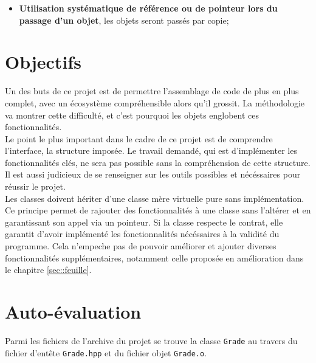 \documentclass[9pts]{article}
\begin{document}
\begin{itemize}
\item \textbf{Utilisation systématique de référence ou de pointeur lors du passage d'un objet}, les objets seront passés par copie;
\end{itemize}

\pagebreak

\section{Objectifs}

Un des buts de ce projet est de permettre l'assemblage de code de plus en plus complet, avec un écosystème compréhensible alors qu'il grossit. La méthodologie va montrer cette difficulté, et
c'est pourquoi les objets englobent ces fonctionnalités. \\

Le point le plus important dans le cadre de ce projet est de comprendre l'interface, la structure imposée. Le travail demandé, qui est d'implémenter les fonctionnalités clés, ne sera pas possible sans la compréhension de cette structure. Il est aussi judicieux de se renseigner sur les outils possibles et nécéssaires pour réussir le projet.\\

Les classes doivent hériter d'une classe mère virtuelle pure sans implémentation. Ce principe permet de rajouter des fonctionnalités à une classe sans l'altérer et en garantissant son appel via un pointeur.
Si la classe respecte le contrat, elle garantit d'avoir implémenté les fonctionnalités nécéssaires à la validité du programme. Cela n'empeche pas de pouvoir améliorer et ajouter diverses fonctionnalités supplémentaires, notamment celle proposée en amélioration dans le chapitre \ref{sec::feuille}. \\

\section{Auto-évaluation}
\label{sec::autoeval}
Parmi les fichiers de l'archive du projet se trouve la classe \texttt{Grade} au travers du fichier d'entête \texttt{Grade.hpp} et du fichier objet \texttt{Grade.o}.\\
\end{document}
